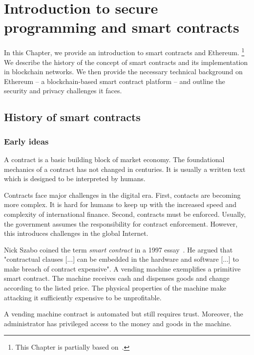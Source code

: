 \chapter{Introduction to secure programming and smart contracts}

\label{Chapter09Introcontracts}

In this Chapter, we provide an introduction to smart contracts and Ethereum.
\footnote{This Chapter is partially based on~\cite{Tikhomirov2017}.}
We describe the history of the concept of smart contracts and its implementation in blockchain networks.
We then provide the necessary technical background on Ethereum -- a blockchain-based smart contract platform -- and outline the security and privacy challenges it faces.


\section{History of smart contracts}

\subsection{Early ideas}

A contract is a basic building block of market economy.
The foundational mechanics of a contract has not changed in centuries.
It is usually a written text which is designed to be interpreted by humans.

Contracts face major challenges in the digital era.
First, contacts are becoming more complex.
It is hard for humans to keep up with the increased speed and complexity of international finance.
Second, contracts must be enforced.
Usually, the government assumes the responsibility for contract enforcement.
However, this introduces challenges in the global Internet.

Nick Szabo coined the term \textit{smart contract} in a 1997 essay~\cite{Szabo1997}.
He argued that "contractual clauses [...] can be embedded in the hardware and software [...] to make breach of contract expensive".
A vending machine exemplifies a primitive smart contract.
The machine receives cash and dispenses goods and change according to the listed price.
The physical properties of the machine make attacking it sufficiently expensive to be unprofitable.

A vending machine contract is automated but still requires trust.
Moreover, the administrator has privileged access to the money and goods in the machine.


